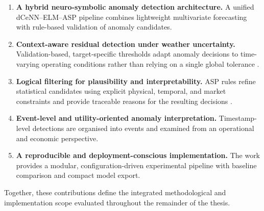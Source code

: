\begin{enumerate}
	\item \textbf{A hybrid neuro-symbolic anomaly detection architecture.}
	A unified dCeNN--ELM--ASP pipeline combines lightweight multivariate forecasting
	with rule-based validation of anomaly candidates.
	
	\item \textbf{Context-aware residual detection under weather uncertainty.}
	Validation-based, target-specific thresholds adapt anomaly decisions to
	time-varying operating conditions rather than relying on a single global
	tolerance
	\cite{hong2016probabilistic,weron2014electricity,shafer2008tutorial}.
	
	\item \textbf{Logical filtering for plausibility and interpretability.}
	ASP rules refine statistical candidates using explicit physical, temporal,
	and market constraints and provide traceable reasons for the resulting
	decisions \cite{gelfond1988stable,gebser2019multi}.
	
	\item \textbf{Event-level and utility-oriented anomaly interpretation.}
	Timestamp-level detections are organised into events and examined from an
	operational and economic perspective.
	
	\item \textbf{A reproducible and deployment-conscious implementation.}
	The work provides a modular, configuration-driven experimental pipeline with
	baseline comparison and compact model export.
\end{enumerate}

Together, these contributions define the integrated methodological and
implementation scope evaluated throughout the remainder of the thesis.

